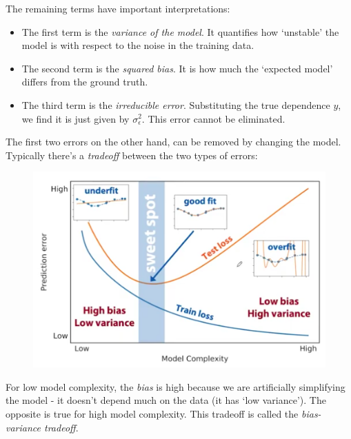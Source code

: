 \newpage
\noindent The remaining terms have important interpretations:
\begin{itemize}
\item The first term is the \textit{variance of the model}. It quantifies how `unstable' the model is with respect to the noise in the training data.
\item The second term is the \textit{squared bias}. It is how much the `expected model' differs from the ground truth.
\item The third term is the \textit{irreducible error}. Substituting the true dependence $y$, we find it is just given by $\sigma_{\epsilon}^2$. This error cannot be eliminated.
\end{itemize}
The first two errors on the other hand, can be removed by changing the model. Typically there's a \textit{tradeoff} between the two types of errors:
\begin{figure}[H]
\centering
\includegraphics[scale=0.4]{biasvariancetradeoff.png}
\end{figure}
For low model complexity, the \textit{bias} is high because we are artificially simplifying the model - it doesn't depend much on the data (it has `low variance'). The opposite is true for high model complexity. This tradeoff is called the \textit{bias-variance tradeoff}.

